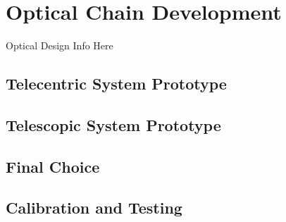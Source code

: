 \section{Optical Chain Development}

Optical Design Info Here

\subsection{Telecentric System Prototype}
\subsection{Telescopic System Prototype}
\subsection{Final Choice}
\subsection{Calibration and Testing}
 